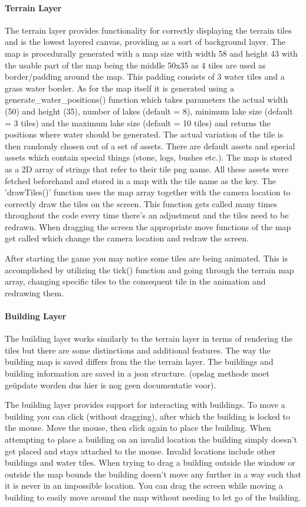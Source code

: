 \documentclass[12pt]{article}
\begin{document}
\paragraph{Terrain Layer}
The terrain layer provides functionality for correctly displaying the terrain tiles and is the lowest layered canvas,
providing as a sort of background layer.
The map is procedurally generated with a map size with width 58 and height 43
with the usable part of the map being the middle 50x35 as 4 tiles are used as border/padding around the map. This padding
consists of 3 water tiles and a grass water border. As for the map itself it is generated using a generate\_water\_positions()
function which takes parameters the actual width (50) and height (35), number of lakes (default = 8), minimum lake size
(default = 3 tiles) and the maximum lake size (default = 10 tiles) and returns the positions where water should be generated.
The actual variation of the tile is then randomly chosen out of a set of assets. There are default assets and special assets
which contain special things (stone, logs, bushes etc.).
The map is stored as a 2D array of strings that refer to their tile png name.
All these assets were fetched beforehand and stored in a map with the tile name as the key. The 'drawTiles()' function
uses the map array together with the camera location to correctly draw the tiles on the screen. This function gets
called many times throughout the code every time there's an adjustment and the tiles need to be redrawn. When dragging
the screen the appropriate move functions of the map get called which change the camera location and redraw the screen.

After starting the game you may notice some tiles are being animated. This is accomplished by utilizing the tick()
function and going through the terrain map array, changing specific tiles to the consequent tile in the animation and
redrawing them.

\paragraph{Building Layer} The building layer works similarly to the terrain layer in terms of rendering the tiles but
there are some distinctions and  additional features. The way the building map is saved differs from the the terrain
layer. The buildings and building information are saved in a json structure. (opslag methode moet ge\"update worden dus
hier is nog geen documentatie voor).

The building layer provides support for interacting with buildings. To move a building you can click (without dragging),
after which the building is locked to the mouse. Move the mouse, then click again to place the building. When attempting
to place a building on an invalid location the building simply doesn't get placed and stays attached to the mouse.
Invalid locations include other buildings and water tiles. When trying to drag a building outside the window or outside
the map bounds the building doesn't move any further in a way such that it is never in an impossible location. You can
drag the screen while moving a building to easily move around the map without needing to let go of the building.
\end{document}
